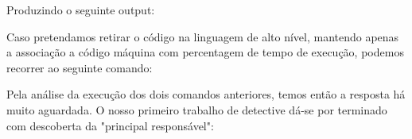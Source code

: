 \documentclass[conference,compsoc]{IEEEtran}
\begin{document}

                                                                                                                                                                                                                       Produzindo o seguinte output: 

                                                                                                                                                                                                                       Caso pretendamos retirar o código na linguagem de alto nível, mantendo apenas a associação a código máquina com percentagem de tempo de execução, podemos recorrer ao seguinte comando:

                                                                                                                                                                                                                       Pela análise da execução dos dois comandos anteriores, temos então a resposta há muito aguardada. O nosso primeiro trabalho de detective dá-se por terminado com descoberta da  "principal responsável":

\end{document}
